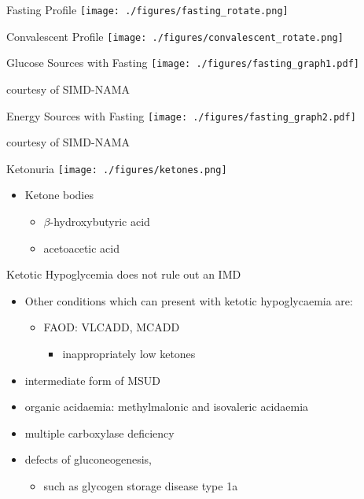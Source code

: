 \documentclass[presentation, smaller]{beamer}
\begin{document}
\begin{frame}[label={sec:orgheadline4}]{Fasting Profile}
\texttt{[image: ./figures/fasting\_rotate.png]}
\end{frame}

\begin{frame}[label={sec:orgheadline5}]{Convalescent Profile}
\texttt{[image: ./figures/convalescent\_rotate.png]}
\end{frame}

\begin{frame}[label={sec:orgheadline6}]{Glucose Sources with Fasting}
\texttt{[image: ./figures/fasting\_graph1.pdf]}

\tiny
courtesy of SIMD-NAMA
\end{frame}

\begin{frame}[label={sec:orgheadline7}]{Energy Sources with Fasting}
\texttt{[image: ./figures/fasting\_graph2.pdf]}

\tiny
courtesy of SIMD-NAMA
\end{frame}

\begin{frame}[label={sec:orgheadline8}]{Ketonuria}
\texttt{[image: ./figures/ketones.png]}

\begin{itemize}
\item Ketone bodies
\begin{itemize}
\item \(\beta\)-hydroxybutyric acid
\item acetoacetic acid
\end{itemize}
\end{itemize}
\end{frame}


\begin{frame}[label={sec:orgheadline9}]{Ketotic Hypoglycemia does not rule out an IMD}
\begin{itemize}
\item Other conditions which can present with ketotic hypoglycaemia are:
\begin{itemize}
\item FAOD: VLCADD, MCADD 
\begin{itemize}
\item inappropriately low ketones
\end{itemize}
\end{itemize}
\item intermediate form of MSUD
\item organic acidaemia: methylmalonic and isovaleric acidaemia
\item multiple carboxylase deficiency
\item defects of gluconeogenesis,
\begin{itemize}
\item such as glycogen storage disease type 1a
\end{itemize}
\end{itemize}
\end{frame}
\end{document}
